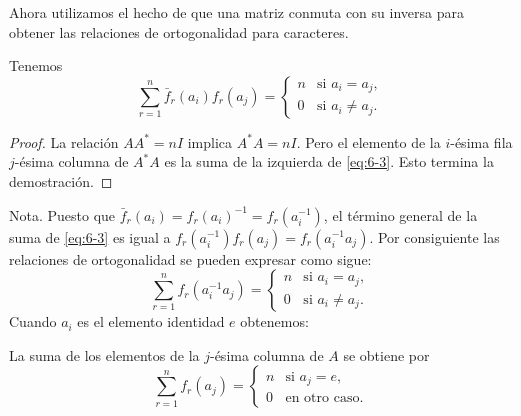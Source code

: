 \documentclass[12pt,a4paper]{book}
\begin{document}
    Ahora utilizamos el hecho de que una matriz conmuta con su inversa para obtener las
    relaciones de ortogonalidad para caracteres.

    \begin{teorema}
        Tenemos
        \begin{equation}\label{eq:6-3}
            \sum_{r=1}^{n}\bar{f}_{r}(a_{i})f_{r}(a_{j})=
            \begin{cases}
                n&\text{si }a_{i}=a_{j},\\
                0&\text{si }a_{i}\neq a_{j}.
            \end{cases}
        \end{equation}
    \end{teorema}

    \begin{proof}
        La relación $AA^{*}=nI$ implica $A^{*}A=nI$. Pero el elemento de la $i$-ésima fila
        $j$-ésima columna de $A^{*}A$ es la suma de la izquierda de \eqref{eq:6-3}. Esto
        termina la demostración.
    \end{proof}

    Nota. Puesto que $\bar{f}_{r}(a_{i})=f_{r}(a_{i})^{-1}=f_{r}(a_{i}^{-1})$, el término general de
    la suma de \eqref{eq:6-3} es igual a $f_{r}(a_{i}^{-1})f_{r}(a_{j})=f_{r}(a_{i}^{-1}a_{j})$. Por
    consiguiente las relaciones de ortogonalidad se pueden expresar como sigue:
    \begin{equation*}
        \sum_{r=1}^{n}f_{r}(a_{i}^{-1}a_{j})=
        \begin{cases}
            n&\text{si }a_{i}=a_{j},\\
            0&\text{si }a_{i}\neq a_{j}.
        \end{cases}
    \end{equation*}
    Cuando $a_{i}$ es el elemento identidad $e$ obtenemos:

    \begin{teorema}
        La suma de los elementos de la $j$-ésima columna de $A$ se obtiene por
        \begin{equation}\label{eq:6-4}
            \sum_{r=1}^{n}f_{r}(a_{j})=
            \begin{cases}
                n&\text{si }a_{j}=e,\\
                0&\text{en otro caso.}
            \end{cases}
        \end{equation}
    \end{teorema}
\end{document}
